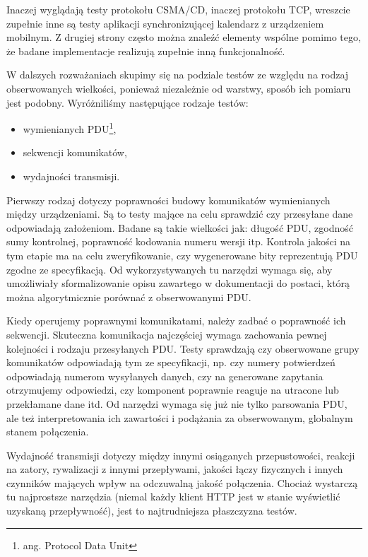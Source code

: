 \documentclass[00-praca-magisterska.tex]{subfiles}
\begin{document}
Inaczej wyglądają testy protokołu CSMA/CD, inaczej protokołu TCP, wreszcie
zupełnie inne są testy aplikacji synchronizującej kalendarz z urządzeniem
mobilnym. Z drugiej strony często można znaleźć elementy wspólne pomimo tego,
że badane implementacje realizują zupełnie inną funkcjonalność.

W dalszych rozważaniach skupimy się na podziale testów ze względu na rodzaj
obserwowanych wielkości, ponieważ niezależnie od warstwy, sposób ich pomiaru
jest podobny. Wyróżniliśmy następujące rodzaje testów:
\begin{itemize}
  \item wymienianych PDU\footnote{ang. Protocol Data Unit},
  \item sekwencji komunikatów,
  \item wydajności transmisji.
\end{itemize}

Pierwszy rodzaj dotyczy poprawności budowy komunikatów wymienianych między
urządzeniami. Są to testy mające na celu sprawdzić czy przesyłane dane
odpowiadają założeniom.  Badane są takie wielkości jak: długość PDU, zgodność
sumy kontrolnej, poprawność kodowania numeru wersji itp. Kontrola jakości na
tym etapie ma na celu zweryfikowanie, czy wygenerowane bity reprezentują PDU
zgodne ze specyfikacją. Od wykorzystywanych tu narzędzi wymaga się, aby
umożliwiały sformalizowanie opisu zawartego w dokumentacji do postaci, którą
można algorytmicznie porównać z obserwowanymi PDU.

Kiedy operujemy poprawnymi komunikatami, należy zadbać o poprawność ich
sekwencji. Skuteczna komunikacja najczęściej wymaga zachowania pewnej
kolejności i rodzaju przesyłanych PDU. Testy sprawdzają czy obserwowane grupy
komunikatów odpowiadają tym ze specyfikacji, np. czy numery potwierdzeń
odpowiadają numerom wysyłanych danych, czy na generowane zapytania otrzymujemy
odpowiedzi, czy komponent poprawnie reaguje na utracone lub przekłamane dane
itd. Od narzędzi wymaga się już nie tylko parsowania PDU, ale też
interpretowania ich zawartości i podążania za obserwowanym, globalnym stanem
połączenia.

Wydajność transmisji dotyczy między innymi osiąganych przepustowości, reakcji
na zatory, rywalizacji z innymi przepływami, jakości łączy fizycznych i innych
czynników mających wpływ na odczuwalną jakość połączenia. Chociaż wystarczą tu
najprostsze narzędzia (niemal każdy klient HTTP jest w stanie wyświetlić
uzyskaną przepływność), jest to najtrudniejsza płaszczyzna testów.
\end{document}

